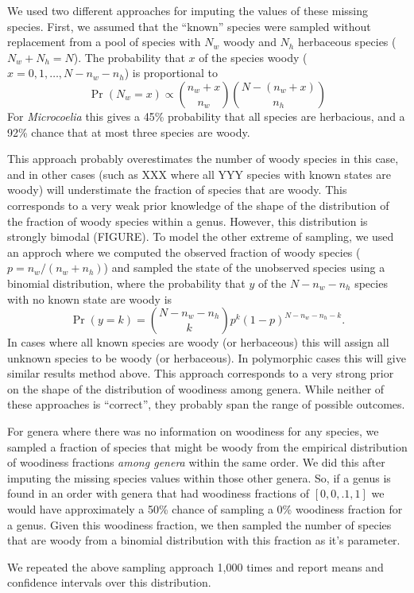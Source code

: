 \documentclass[12pt]{article}
\begin{document}
We used two different approaches for imputing the values of these
missing species.  First, we assumed that the ``known'' species were
sampled without replacement from a pool of species with $N_w$ woody
and $N_h$ herbaceous species ($N_w + N_h = N$).  The probability that
$x$ of the species woody ($x = 0, 1, \ldots, N
- n_w - n_h$) is proportional to
\begin{equation}
  \Pr(N_w = x) \propto {n_w + x \choose n_w}
  {N - (n_w + x) \choose n_h}
\end{equation}
For \textit{Microcoelia} this gives a 45\% probability that all
species are herbacious, and a 92\% chance that at most three species
are woody.

This approach probably overestimates the number of woody species in
this case, and in other cases (such as XXX where all YYY species with
known states are woody) will understimate the fraction of species that
are woody.  This corresponds to a very weak prior knowledge of the
shape of the distribution of the fraction of woody species within a
genus.  However, this distribution is strongly bimodal (FIGURE).  To
model the other extreme of sampling, we used an approch where we
computed the observed fraction of woody species ($p = n_w / (n_w +
n_h)$) and sampled the state of the unobserved species using a
binomial distribution, where the probability that $y$ of the $N - n_w
- n_h$ species with no known state are woody is
\begin{equation}
  \Pr(y = k) = {N - n_w - n_h \choose k} p^k (1-p)^{N - n_w - n_h - k}.
\end{equation}
In cases where all known species are woody (or herbaceous) this will
assign all unknown species to be woody (or herbaceous).  In
polymorphic cases this will give similar results method above.  This
approach corresponds to a very strong prior on the shape of the
distribution of woodiness among genera.
While neither of these approaches is ``correct'', they probably
span the range of possible outcomes.

For genera where there was no information on woodiness for any
species, we sampled a fraction of species that might be woody from the
empirical distribution of woodiness fractions \textit{among genera}
within the same order.  We did this after imputing the missing species
values within those other genera.  So, if a genus is found in an order
with genera that had woodiness fractions of $[0, 0, .1, 1]$ we would
have approximately a 50\% chance of sampling a 0\% woodiness fraction
for a genus.  Given this woodiness fraction, we then sampled the
number of species that are woody from a binomial distribution with
this fraction as it's parameter.

We repeated the above sampling approach 1,000 times and report means
and confidence intervals over this distribution.



\end{document}
